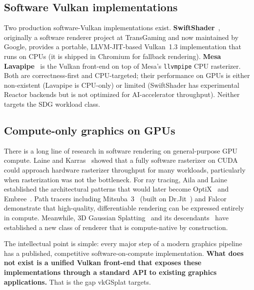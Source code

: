 \documentclass[10pt,journal]{IEEEtran}
\begin{document}
\subsection{Software Vulkan implementations}

Two production software-Vulkan implementations exist.
\textbf{SwiftShader}~\cite{swiftshader}, originally a software renderer
project at TransGaming and now maintained by Google, provides a portable,
LLVM-JIT-based Vulkan~1.3 implementation that runs on CPUs (it is shipped
in Chromium for fallback rendering). \textbf{Mesa Lavapipe}~\cite{mesa-lavapipe}
is the Vulkan front-end on top of Mesa's \texttt{llvmpipe} CPU rasterizer.
Both are correctness-first and CPU-targeted; their performance on GPUs is
either non-existent (Lavapipe is CPU-only) or limited (SwiftShader has
experimental Reactor backends but is not optimized for AI-accelerator
throughput). Neither targets the SDG workload class.

\subsection{Compute-only graphics on GPUs}

There is a long line of research in software rendering on
general-purpose GPU compute. Laine and
Karras~\cite{laine2011software} showed that a fully software rasterizer
on CUDA could approach hardware rasterizer throughput for many workloads,
particularly when rasterization was not the bottleneck.
For ray tracing, Aila and Laine~\cite{aila2009understanding} established
the architectural patterns that would later become OptiX~\cite{parker2010optix}
and Embree~\cite{wald2014embree}. Path tracers including
Mitsuba~3~\cite{jakob2022mitsuba3} (built on Dr.Jit~\cite{jakob2022drjit})
and Falcor~\cite{benty2020falcor} demonstrate that high-quality,
differentiable rendering can be expressed entirely in compute.
Meanwhile, 3D Gaussian Splatting~\cite{kerbl20233dgs} and its
descendants~\cite{yu2024mip,huang20242dgs} have established a new class
of renderer that is compute-native by construction.

The intellectual point is simple: every major step of a modern graphics
pipeline has a published, competitive software-on-compute implementation.
\textbf{What does not exist is a unified Vulkan front-end that exposes
these implementations through a standard API to existing graphics
applications.} That is the gap vkGSplat targets.

\end{document}
